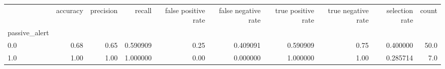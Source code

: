 \begin{tabular}{lrrrrrrrrr}
\toprule
{} &  accuracy &  precision &    recall &  false positive rate &  false negative rate &  true positive rate &  true negative rate &  selection rate &  count \\
passive\_alert &           &            &           &                      &                      &                     &                     &                 &        \\
\midrule
0.0           &      0.68 &       0.65 &  0.590909 &                 0.25 &             0.409091 &            0.590909 &                0.75 &        0.400000 &   50.0 \\
1.0           &      1.00 &       1.00 &  1.000000 &                 0.00 &             0.000000 &            1.000000 &                1.00 &        0.285714 &    7.0 \\
\bottomrule
\end{tabular}

